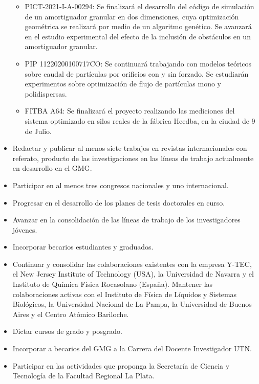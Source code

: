 \documentclass[a4paper,11pt,twoside,final,titlepage,onecolumn,openright]{report}
\begin{document}
\begin{itemize}
\begin{itemize}
\item PICT-2021-I-A-00294: Se finalizará el desarrollo del código de simulación de un amortiguador granular en dos dimensiones, cuya optimización geométrica se realizará por medio de un algoritmo genético. Se avanzará en el estudio experimental del efecto de la inclusión de obstáculos en un amortiguador granular. 
\item PIP 11220200100717CO: Se continuará trabajando con modelos teóricos sobre caudal de partículas por orificios con y sin forzado. Se estudiarán experimentos sobre optimización de flujo de partículas mono y polidispersas. 
\item FITBA A64: Se finalizará el proyecto realizando las mediciones del sistema optimizado en silos reales de la fábrica Heedba, en la ciudad de 9 de Julio.
\end{itemize}
\item  Redactar y publicar al menos siete trabajos en revistas internacionales con referato, producto de las investigaciones en las líneas de trabajo actualmente en desarrollo en el GMG.
\item  Participar en al menos tres congresos nacionales y uno internacional. 
\item  Progresar en el desarrollo de los planes de tesis doctorales en curso.
\item  Avanzar en la consolidación de las líneas de trabajo de los investigadores jóvenes. 
\item  Incorporar becarios estudiantes y graduados. 
\item  Continuar y consolidar las colaboraciones existentes con la empresa Y-TEC, el New Jersey Institute of Technology (USA), la Universidad de Navarra y el Instituto de Química Física Rocasolano (España). Mantener las colaboraciones activas con el Instituto de Física de Líquidos y Sistemas Biológicos, la Universidad Nacional de La Pampa, la Universidad de Buenos Aires y el Centro Atómico Bariloche.
\item  Dictar cursos de grado y posgrado.
\item  Incorporar a becarios del GMG a la Carrera del Docente Investigador UTN.
\item  Participar en las actividades que proponga la Secretaría de Ciencia y Tecnología de la Facultad Regional La Plata.
\end{itemize}
\end{document}
